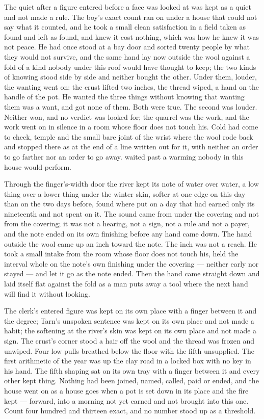 The quiet after a figure entered before a face was looked at was kept as a quiet and not made a rule. The boy's exact count ran on under a house that could not say what it counted, and he took a small clean satisfaction in a field taken as found and left as found, and knew it cost nothing, which was how he knew it was not peace. He had once stood at a bay door and sorted twenty people by what they would not survive, and the same hand lay now outside the wool against a fold of a kind nobody under this roof would have thought to keep; the two kinds of knowing stood side by side and neither bought the other. Under them, louder, the wanting went on: the crust lifted two inches, the thread wiped, a hand on the handle of the pot. He wanted the three things without knowing that wanting them was a want, and got none of them. Both were true. The second was louder. Neither won, and no verdict was looked for; the quarrel was the work, and the work went on in silence in a room whose floor does not touch his. Cold had come to cheek, temple and the small bare joint of the wrist where the wool rode back and stopped there as at the end of a line written out for it, with neither an order to go farther nor an order to go away.  waited past a warming nobody in this house would perform.

Through the finger's-width door the river kept its note of water over water, a low thing over a lower thing under the winter skin, softer at one edge on this day than on the two days before, found where put on a day that had earned only its nineteenth and not spent on it. The sound came from under the covering and not from the covering; it was not a hearing, not a sign, not a rule and not a payer, and the note ended on its own finishing before any hand came down. The hand outside the wool came up an inch toward the note. The inch was not a reach. He took a small intake from the room whose floor does not touch his, held the interval whole on the note's own finishing under the covering --- neither early nor stayed --- and let it go as the note ended. Then the hand came straight down and laid itself flat against the fold as a man puts away a tool where the next hand will find it without looking.

The clerk's entered figure was kept on its own place with a finger between it and the degree; Tarn's unspoken sentence was kept on its own place and not made a habit; the softening at the river's skin was kept on its own place and not made a sign. The crust's corner stood a hair off the wool and the thread was frozen and unwiped. Four low pulls breathed below the floor with the fifth unsupplied. The first arithmetic of the year was up the clay road in a locked box with no key in his hand. The fifth shaping sat on its own tray with a finger between it and every other kept thing. Nothing had been joined, named, called, paid or ended, and the house went on as a house goes when a pot is set down in its place and the fire kept --- forward, into a morning not yet earned and not brought into this one. Count four hundred and thirteen exact, and no number stood up as a threshold.
